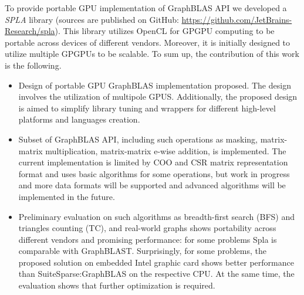 To provide portable GPU implementation of GraphBLAS API we developed a \textit{SPLA} library (sources are published on GitHub: \url{https://github.com/JetBrains-Research/spla}).
This library utilizes OpenCL for GPGPU computing to be portable across devices of different vendors.
Moreover, it is initially designed to utilize multiple GPGPUs to be scalable.
To sum up, the contribution of this work is the following.
\begin{itemize}
    \item Design of portable GPU GraphBLAS implementation proposed. The design involves the utilization of multipole GPUS. Additionally, the proposed design is aimed to simplify library tuning and wrappers for different high-level platforms and languages creation. 
    \item Subset of GraphBLAS API, including such operations as masking, matrix-matrix multiplication, matrix-matrix e-wise addition, is implemented. The current implementation is limited by COO and CSR matrix representation format and uses basic algorithms for some operations, but work in progress and more data formats will be supported and advanced algorithms will be implemented in the future.
    \item Preliminary evaluation on such algorithms as breadth-first search (BFS) and triangles counting (TC), and real-world graphs shows portability across different vendors and promising performance: for some problems Spla is comparable with GraphBLAST. Surprisingly, for some problems, the proposed solution on embedded Intel graphic card shows better performance than SuiteSparse:GraphBLAS on the respective CPU. At the same time, the evaluation shows that further optimization is required.
\end{itemize} 